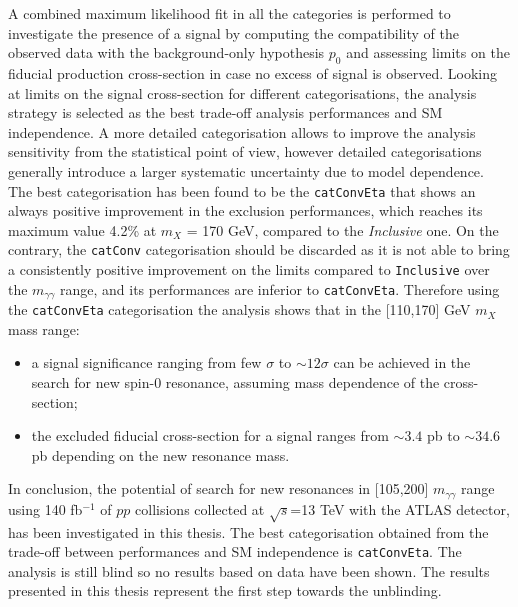 \documentclass[a4paper, oneside, 11pt, openright]{book}
\begin{document}
		A combined maximum likelihood fit in all the categories is performed to investigate the presence of a signal by computing the compatibility of the observed data with the background-only hypothesis $p_0$ \cite{Statistic} and assessing limits \cite{Statistic} on the fiducial production cross-section in case no excess of signal is observed. Looking at limits on the signal cross-section for different categorisations, the analysis strategy is selected as the best trade-off analysis performances and SM independence. A more detailed categorisation allows to improve the analysis sensitivity from the statistical point of view, however detailed categorisations generally introduce a larger systematic uncertainty due to model dependence. The best categorisation has been found to be the \texttt{catConvEta} that shows an always positive improvement in the exclusion performances, which reaches its maximum value 4.2\% at $m_X$ = 170 GeV, compared to the \textit{Inclusive} one. On the contrary, the \texttt{catConv} categorisation should be discarded as it is not able to bring a consistently positive improvement on the limits compared to \texttt{Inclusive} over the $m_{\gamma\gamma}$ range, and its performances are inferior to \texttt{catConvEta}. Therefore using the \texttt{catConvEta} categorisation the analysis shows that in the [110,170] GeV $m_X$ mass range:
		\begin{itemize}
			\item a signal significance ranging from few $\sigma$ to $\sim12\sigma$ can be achieved in the search for new spin-0 resonance, assuming mass dependence of the cross-section;
			\item the excluded fiducial cross-section for a signal ranges from $\sim 3.4$ pb to $\sim 34.6$ pb depending on the new resonance mass.
		\end{itemize}
		
		In conclusion, the potential of search for new resonances in [105,200] $m_{\gamma\gamma}$ range using 140 fb$^{-1}$ of $pp$ collisions collected at $\sqrt{s}$=13 TeV with the ATLAS detector, has been investigated in this thesis. The best categorisation obtained from the trade-off between performances and SM independence is \texttt{catConvEta}. The analysis is still blind so no results based on data have been shown. The results presented in this thesis represent the first step towards the unblinding.
		
		
		
 			
\end{document}

